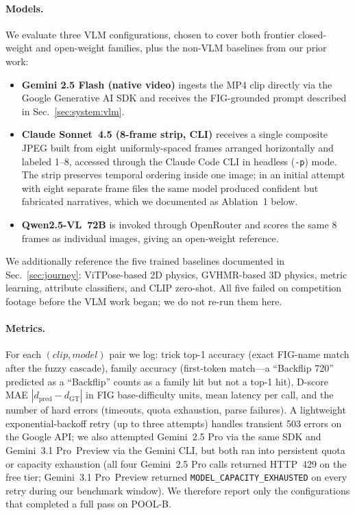 \paragraph{Models.}
We evaluate three VLM configurations, chosen to cover both frontier
closed-weight and open-weight families, plus the
non-VLM baselines from our prior work:
\begin{itemize}
  \setlength\itemsep{-1pt}
  \item \textbf{Gemini 2.5 Flash (native video)} ingests the MP4 clip
        directly via the Google Generative AI SDK and receives the
        FIG-grounded prompt described in Sec.~\ref{sec:system:vlm}.
  \item \textbf{Claude Sonnet~4.5 (8-frame strip, CLI)} receives a
        single composite JPEG built from eight uniformly-spaced
        frames arranged horizontally and labeled 1--8, accessed
        through the Claude Code CLI in headless (\texttt{-p}) mode.
        The strip preserves temporal ordering inside one image; in
        an initial attempt with eight separate frame files the same
        model produced confident but fabricated narratives, which
        we documented as Ablation~1 below.
  \item \textbf{Qwen2.5-VL~72B} is invoked through OpenRouter and
        scores the same 8 frames as individual images, giving an
        open-weight reference.
\end{itemize}
We additionally reference the five trained baselines documented in
Sec.~\ref{sec:journey}: ViTPose-based 2D physics, GVHMR-based 3D
physics, metric learning, attribute classifiers, and CLIP zero-shot.
All five failed on competition footage before the VLM work began;
we do not re-run them here.

\paragraph{Metrics.}
For each $(clip, model)$ pair we log: trick top-1 accuracy (exact
FIG-name match after the fuzzy cascade), family accuracy (first-token
match---a ``Backflip 720'' predicted as a ``Backflip'' counts as a
family hit but not a top-1 hit), D-score MAE
$|d_{\text{pred}} - d_{\text{GT}}|$ in FIG base-difficulty units,
mean latency per call, and the number of hard errors (timeouts,
quota exhaustion, parse failures). A lightweight exponential-backoff
retry (up to three attempts) handles transient 503 errors on the
Google API; we also attempted Gemini~2.5 Pro via the same SDK and
Gemini~3.1 Pro~Preview via the Gemini CLI, but both ran into
persistent quota or capacity exhaustion (all four Gemini~2.5 Pro calls
returned HTTP~429 on the free tier; Gemini~3.1 Pro~Preview returned
\texttt{MODEL\_CAPACITY\_EXHAUSTED} on every retry during our
benchmark window). We therefore report only the configurations that
completed a full pass on POOL-B.


